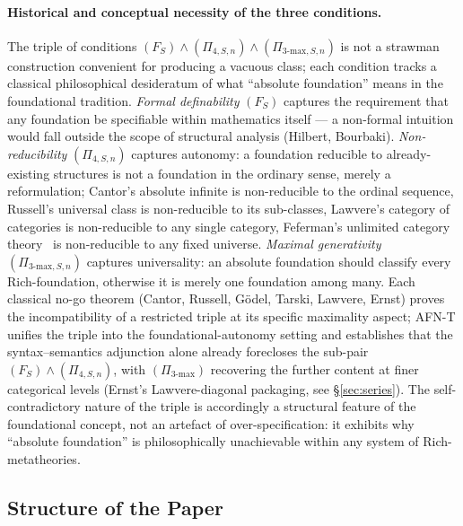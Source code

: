 \documentclass[11pt]{article}
\theoremstyle{plain}
\theoremstyle{definition}
\begin{document}
\paragraph{Historical and conceptual necessity of the three conditions.}
The triple of conditions $(F_S) \wedge (\Pi_{4, S, n}) \wedge (\Pi_{3\text{-max}, S, n})$ is not a strawman construction convenient for producing a vacuous class; each condition tracks a classical philosophical desideratum of what ``absolute foundation'' means in the foundational tradition. \emph{Formal definability} $(F_S)$ captures the requirement that any foundation be specifiable within mathematics itself --- a non-formal intuition would fall outside the scope of structural analysis (Hilbert, Bourbaki). \emph{Non-reducibility} $(\Pi_{4, S, n})$ captures autonomy: a foundation reducible to already-existing structures is not a foundation in the ordinary sense, merely a reformulation; Cantor's absolute infinite is non-reducible to the ordinal sequence, Russell's universal class is non-reducible to its sub-classes, Lawvere's category of categories is non-reducible to any single category, Feferman's unlimited category theory~\cite{Feferman2013} is non-reducible to any fixed universe. \emph{Maximal generativity} $(\Pi_{3\text{-max}, S, n})$ captures universality: an absolute foundation should classify every Rich-foundation, otherwise it is merely one foundation among many. Each classical no-go theorem (Cantor, Russell, G\"odel, Tarski, Lawvere, Ernst) proves the incompatibility of a restricted triple at its specific maximality aspect; AFN-T unifies the triple into the foundational-autonomy setting and establishes that the syntax--semantics adjunction alone already forecloses the sub-pair $(F_S) \wedge (\Pi_{4, S, n})$, with $(\Pi_{3\text{-max}})$ recovering the further content at finer categorical levels (Ernst's Lawvere-diagonal packaging, see \S\ref{sec:series}). The self-contradictory nature of the triple is accordingly a structural feature of the foundational concept, not an artefact of over-specification: it exhibits why ``absolute foundation'' is philosophically unachievable within any system of Rich-metatheories.

\subsection{Structure of the Paper}
\end{document}
